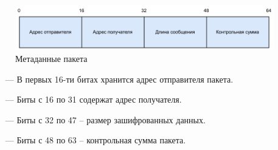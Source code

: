\begin{figure}[H]
	\centering
	\includegraphics[width=\textwidth]{img/header.pdf}
	\caption{Метаданные пакета}
	\label{fig:header}
\end{figure}

\begin{itemize}
	\item [---] В первых 16-ти битах хранится адрес отправителя пакета.
	\item [---] Биты с 16 по 31 содержат адрес получателя.
	\item [---] Биты с 32 по 47 -- размер зашифрованных данных.
	\item [---] Биты с 48 по 63 -- контрольная сумма пакета.
\end{itemize}

\pagebreak